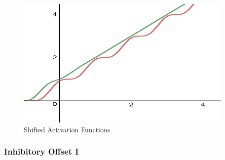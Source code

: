 \documentclass{amsart}
\theoremstyle{definition}
\theoremstyle{remark}
\numberwithin{equation}{section}
\newcommand{\blankbox}[2]{%
  \parbox{\columnwidth}{\centering
    \setlength{\fboxsep}{0pt}%
    \fbox{\raisebox{0pt}[#2]{\hspace{#1}}}%
  }%
}
\begin{document}
\begin{figure}[!h]
\includegraphics[1]{ShiftedCurves.png}
\caption{Shifted Activation Functions}
\label{Figure 9}
\end{figure} 

\subsubsection{Inhibitory Offset I} \hfill\break   
\end{document}
